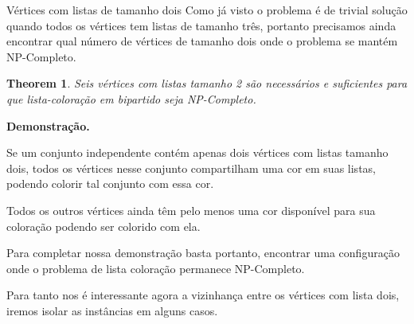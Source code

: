 \documentclass[9pt, compress]{beamer}
\newtheorem{teorema}{Theorem}
\newcommand{\?}{\textcolor{warn}{\textit{?}}}
\begin{document}
     \begin{frame}{Vértices com listas de tamanho dois}
       Como já visto o problema é de trivial solução quando todos os vértices tem listas de tamanho três, portanto precisamos ainda encontrar qual número de vértices de tamanho dois onde o problema se mantém NP-Completo.
       \begin{teorema}
         Seis vértices com listas tamanho 2 são necessários e suficientes para que lista-coloração em bipartido seja NP-Completo.
       \end{teorema}
       \textbf{Demonstração.}
       
 
       Se um conjunto independente contém apenas dois vértices com listas tamanho dois, todos os vértices nesse conjunto compartilham uma cor em suas listas, podendo colorir tal conjunto com essa cor.
       
        Todos os outros vértices ainda têm pelo menos uma cor disponível para sua coloração podendo ser colorido com ela. 
       
       Para completar nossa demonstração basta portanto, encontrar uma configuração onde o problema de lista coloração permanece NP-Completo.
 
       Para tanto nos é interessante agora a vizinhança entre os vértices com lista dois, iremos isolar as instâncias em alguns casos.  
       
     \end{frame}
     
\end{document}
